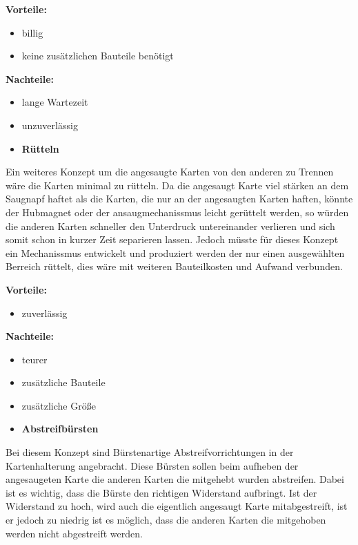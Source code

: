 \textbf{Vorteile:}
\begin{itemize}
    \item billig
    \item keine zusätzlichen Bauteile benötigt
\end{itemize}
\textbf{Nachteile:}
\begin{itemize}
    \item lange Wartezeit
    \item unzuverlässig
\end{itemize}

\begin{itemize}
    \item \textbf{Rütteln}
\end{itemize}

Ein weiteres Konzept um die angesaugte Karten von den anderen zu Trennen wäre die Karten minimal zu rütteln.
Da die angesaugt Karte viel stärken an dem Saugnapf haftet als die Karten, die nur an der angesaugten Karten haften,
könnte der Hubmagnet oder der ansaugmechanissmus leicht gerüttelt werden, so würden die anderen Karten schneller den
Unterdruck untereinander verlieren und sich somit schon in kurzer Zeit separieren lassen. Jedoch müsste für dieses Konzept
ein Mechanissmus entwickelt und produziert werden der nur einen ausgewählten Berreich rüttelt, dies wäre mit weiteren Bauteilkosten und
Aufwand verbunden.

\textbf{Vorteile:}
\begin{itemize}
    \item zuverlässig
\end{itemize}
\textbf{Nachteile:}
\begin{itemize}
    \item teurer
    \item zusätzliche Bauteile
    \item zusätzliche Größe
\end{itemize}


\begin{itemize}
    \item \textbf{Abstreifbürsten}
\end{itemize}

Bei diesem Konzept sind Bürstenartige Abstreifvorrichtungen in der Kartenhalterung angebracht. Diese Bürsten sollen beim aufheben der
angesaugeten Karte die anderen Karten die mitgehebt wurden abstreifen. Dabei ist es wichtig, dass die Bürste den richtigen Widerstand aufbringt.
Ist der Widerstand zu hoch, wird auch die eigentlich angesaugt Karte mitabgestreift, ist er jedoch zu niedrig ist es möglich, dass die anderen Karten
die mitgehoben werden nicht abgestreift werden.

